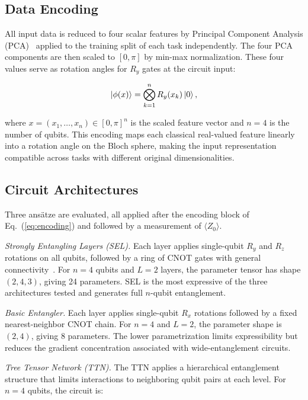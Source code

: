 \documentclass[10pt,conference]{IEEEtran}
\begin{document}
\subsection{Data Encoding}

All input data is reduced to four scalar features by Principal
Component Analysis (PCA)~\cite{pearson1901lines} applied to the
training split of each task independently. The four PCA components are
then scaled to $[0, \pi]$ by min-max normalization. These four values
serve as rotation angles for $R_y$ gates at the circuit input:

\begin{equation}
  \ket{\phi(x)} = \bigotimes_{k=1}^{n} R_y(x_k)\ket{0},
  \label{eq:encoding}
\end{equation}

where $x = (x_1, \ldots, x_n) \in [0,\pi]^n$ is the scaled feature
vector and $n = 4$ is the number of qubits. This encoding maps each
classical real-valued feature linearly into a rotation angle on the
Bloch sphere, making the input representation compatible across tasks
with different original dimensionalities.

\subsection{Circuit Architectures}

Three ans\"{a}tze are evaluated, all applied after the encoding block of
Eq.~(\ref{eq:encoding}) and followed by a measurement of
$\langle Z_0 \rangle$.

\textit{Strongly Entangling Layers (SEL).} Each layer applies
single-qubit $R_y$ and $R_z$ rotations on all qubits, followed by a
ring of CNOT gates with general connectivity~\cite{sim2019expressibility}.
For $n = 4$ qubits and $L = 2$ layers, the parameter tensor has shape
$(2, 4, 3)$, giving 24 parameters. SEL is the most expressive of the
three architectures tested and generates full $n$-qubit entanglement.

\textit{Basic Entangler.} Each layer applies single-qubit $R_x$
rotations followed by a fixed nearest-neighbor CNOT chain. For $n = 4$
and $L = 2$, the parameter shape is $(2, 4)$, giving 8 parameters. The
lower parametrization limits expressibility but reduces the gradient
concentration associated with wide-entanglement circuits.

\textit{Tree Tensor Network (TTN).} The TTN applies a hierarchical
entanglement structure that limits interactions to neighboring qubit
pairs at each level. For $n = 4$ qubits, the circuit is:
\end{document}
